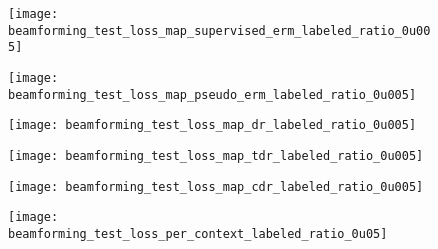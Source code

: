 \documentclass[journal]{IEEEtran}
\begin{document}
\begin{figure*}
    \centering
    \begin{subfigure}{0.24\textwidth}
        \centering
        \texttt{[image: beamforming\_test\_loss\_map\_supervised\_erm\_labeled\_ratio\_0u005]}
        \vspace{-0.24in}
        \caption{}
        \label{subfig:loss_map_erm}
    \end{subfigure}
    \hfill
    \begin{subfigure}{0.24\textwidth}
        \centering
        \texttt{[image: beamforming\_test\_loss\_map\_pseudo\_erm\_labeled\_ratio\_0u005]}
        \vspace{-0.24in}
        \caption{}
        \label{subfig:loss_map_pseudo_erm}
    \end{subfigure}
    \hfill
    \begin{subfigure}{0.24\textwidth}
        \centering
        \texttt{[image: beamforming\_test\_loss\_map\_dr\_labeled\_ratio\_0u005]}
        \vspace{-0.24in}
        \caption{}
        \label{subfig:loss_map_dr}
    \end{subfigure}
    \hfill
    \begin{subfigure}{0.24\textwidth}
        \centering
        \texttt{[image: beamforming\_test\_loss\_map\_tdr\_labeled\_ratio\_0u005]}
        \vspace{-0.24in}
        \caption{}
        \label{subfig:loss_map_tdr}
    \end{subfigure}
    \begin{subfigure}{0.24\textwidth}
        \centering
        \texttt{[image: beamforming\_test\_loss\_map\_cdr\_labeled\_ratio\_0u005]}
        \vspace{-0.24in}
        \caption{}
        \label{subfig:loss_map_cdr}
    \end{subfigure}
    \begin{subfigure}{0.50\textwidth}
        \centering
        \texttt{[image: beamforming\_test\_loss\_per\_context\_labeled\_ratio\_0u05]}
        \caption{}
        \label{subfig:loss_per_context_barplot}
    \end{subfigure}

\end{figure*}
\end{document}
